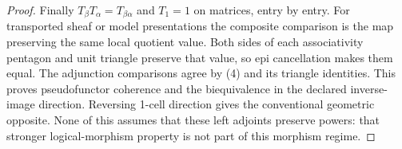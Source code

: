 \begin{proof}
Finally \(T_\beta T_\alpha=T_{\beta\alpha}\) and
\(T_1=1\) on matrices, entry by entry. For transported sheaf or
model presentations the composite comparison is the map preserving
the same local quotient value. Both sides of each associativity
pentagon and unit triangle preserve that value, so epi cancellation
makes them equal. The adjunction comparisons agree by (4) and its
triangle identities. This proves pseudofunctor coherence and the
biequivalence in the declared inverse-image direction. Reversing
1-cell direction gives the conventional geometric opposite. None
of this assumes that these left adjoints preserve powers: that stronger
logical-morphism property is not part of this morphism regime.
\end{proof}
